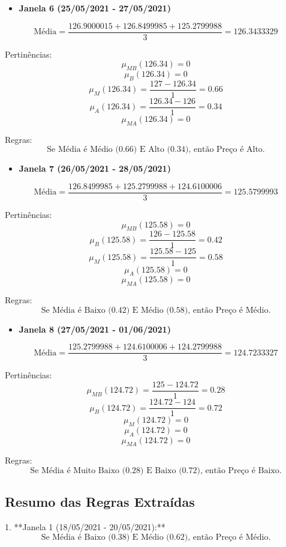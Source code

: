 \documentclass[a4paper, 12pt]{article}
\begin{document}
\begin{itemize}
    \item \textbf{Janela 6 (25/05/2021 - 27/05/2021)}
\end{itemize}

\[
\text{Média} = \frac{126.9000015 + 126.8499985 + 125.2799988}{3} = 126.3433329
\]

Pertinências:
\[
\mu_{MB}(126.34) = 0
\]
\[
\mu_{B}(126.34) = 0
\]
\[
\mu_{M}(126.34) = \frac{127 - 126.34}{1} = 0.66
\]
\[
\mu_{A}(126.34) = \frac{126.34 - 126}{1} = 0.34
\]
\[
\mu_{MA}(126.34) = 0
\]

Regras:
\[
\text{Se Média é Médio (0.66) E Alto (0.34), então Preço é Alto.}
\]

\begin{itemize}
    \item \textbf{Janela 7 (26/05/2021 - 28/05/2021)}
\end{itemize}

\[
\text{Média} = \frac{126.8499985 + 125.2799988 + 124.6100006}{3} = 125.5799993
\]

Pertinências:
\[
\mu_{MB}(125.58) = 0
\]
\[
\mu_{B}(125.58) = \frac{126 - 125.58}{1} = 0.42
\]
\[
\mu_{M}(125.58) = \frac{125.58 - 125}{1} = 0.58
\]
\[
\mu_{A}(125.58) = 0
\]
\[
\mu_{MA}(125.58) = 0
\]

Regras:
\[
\text{Se Média é Baixo (0.42) E Médio (0.58), então Preço é Médio.}
\]

\begin{itemize}
    \item \textbf{Janela 8 (27/05/2021 - 01/06/2021)}
\end{itemize}

\[
\text{Média} = \frac{125.2799988 + 124.6100006 + 124.2799988}{3} = 124.7233327
\]

Pertinências:
\[
\mu_{MB}(124.72) = \frac{125 - 124.72}{1} = 0.28
\]
\[
\mu_{B}(124.72) = \frac{124.72 - 124}{1} = 0.72
\]
\[
\mu_{M}(124.72) = 0
\]
\[
\mu_{A}(124.72) = 0
\]
\[
\mu_{MA}(124.72) = 0
\]

Regras:
\[
\text{Se Média é Muito Baixo (0.28) E Baixo (0.72), então Preço é Baixo.}
\]

\subsection{Resumo das Regras Extraídas}

1. **Janela 1 (18/05/2021 - 20/05/2021):**
   \[
   \text{Se Média é Baixo (0.38) E Médio (0.62), então Preço é Médio.}
   \]
\end{document}
